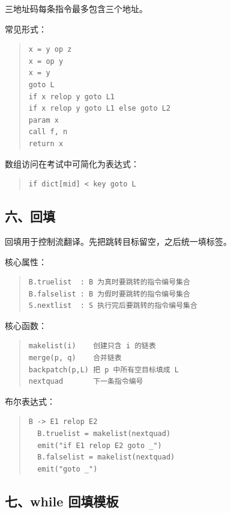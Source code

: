 \documentclass[UTF8,zihao=-4]{ctexart}
\begin{document}
三地址码每条指令最多包含三个地址。


常见形式：


\begin{quote}
\footnotesize
\begin{verbatim}
x = y op z
x = op y
x = y
goto L
if x relop y goto L1
if x relop y goto L1 else goto L2
param x
call f, n
return x
\end{verbatim}
\end{quote}


数组访问在考试中可简化为表达式：


\begin{quote}
\footnotesize
\begin{verbatim}
if dict[mid] < key goto L
\end{verbatim}
\end{quote}


\subsection{六、回填}


回填用于控制流翻译。先把跳转目标留空，之后统一填标签。


核心属性：


\begin{quote}
\footnotesize
\begin{verbatim}
B.truelist  : B 为真时要跳转的指令编号集合
B.falselist : B 为假时要跳转的指令编号集合
S.nextlist  : S 执行完后要跳转的指令编号集合
\end{verbatim}
\end{quote}


核心函数：


\begin{quote}
\footnotesize
\begin{verbatim}
makelist(i)    创建只含 i 的链表
merge(p, q)    合并链表
backpatch(p,L) 把 p 中所有空目标填成 L
nextquad       下一条指令编号
\end{verbatim}
\end{quote}


布尔表达式：


\begin{quote}
\footnotesize
\begin{verbatim}
B -> E1 relop E2
  B.truelist = makelist(nextquad)
  emit("if E1 relop E2 goto _")
  B.falselist = makelist(nextquad)
  emit("goto _")
\end{verbatim}
\end{quote}


\subsection{七、while 回填模板}
\end{document}
